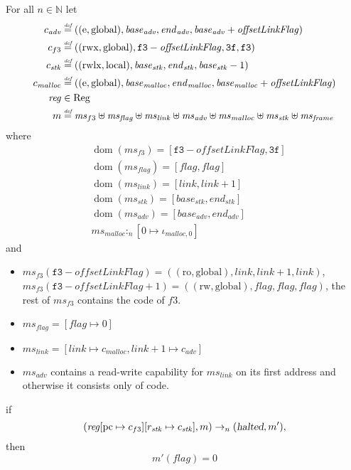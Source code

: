 \documentclass[a4paper]{article}
\newcommand{\update}[2]{[#1 \mapsto #2]}
\newcommand{\defeq}{\stackrel{\textit{\tiny{def}}}{=}}
\DeclareMathOperator{\dom}{dom}
\newcommand{\var}[1]{\mathit{#1}}
\newcommand{\hs}{\var{ms}}
\newcommand{\ms}{\hs}
\newcommand{\pcreg}{\mathrm{pc}}
\newcommand{\start}{\var{base}}
\newcommand{\addrend}{\var{end}}
\newcommand{\reg}{\var{reg}}
\newcommand{\heap}{\var{mem}}
\newcommand{\adv}{\var{adv}}
\newcommand{\link}{\var{link}}
\newcommand{\stk}{\var{stk}}
\newcommand{\flag}{\var{flag}}
\newcommand{\olf}{\var{offsetLinkFlag}}
\newcommand{\halted}{\textsl{halted}}
\newcommand{\heapSat}[3][\heap]{#1 :_{#2} #3}
\newcommand{\codelabel}[1]{\mathit{#1}}
\newcommand{\malloc}{\codelabel{malloc}}
\newcommand{\plaindom}[1]{\mathrm{#1}}
\newcommand{\Regs}{\plaindom{Reg}}
\newcommand{\nats}{\mathbb{N}}
\newcommand{\plainperm}[1]{\mathrm{#1}}
\newcommand{\readonly}{\plainperm{ro}}
\newcommand{\readwrite}{\plainperm{rw}}
\newcommand{\entry}{\plainperm{e}}
\newcommand{\rwx}{\plainperm{rwx}}
\newcommand{\rwlx}{\plainperm{rwlx}}
\newcommand{\local}{\plainperm{local}}
\newcommand{\glob}{\plainperm{global}}
\newcommand{\step}[1][]{\rightarrow_{#1}}
\begin{document}
\begin{lemma}
  \label{lem:correctness-f3}
  For all $n \in \nats$
  let
  \begin{align*}
    c_{\var{adv}} & \defeq ((\entry,\glob),\start_{\adv},\addrend_{\adv},\start_{\adv}+\olf) \\
    c_{f3} & \defeq ((\rwx,\glob),\mathtt{f3}-\olf,\mathtt{3f},\mathtt{f3}) \\
    c_{\var{stk}} & \defeq ((\rwlx,\local),\start_\stk,\addrend_\stk,\start_\stk-1) \\
    c_\malloc & \defeq ((\entry,\glob),\start_\malloc,\addrend_\malloc,\start_\malloc+\olf) \\
    \reg & \in \Regs \\
    m & \defeq \hs_{f3} \uplus 
        \hs_\flag \uplus                
        \ms_{\var{link}} \uplus 
        \hs_\adv \uplus 
        \ms_{\malloc} \uplus 
        \ms_{\var{stk}} \uplus
        \ms_{\var{frame}} 
  \end{align*}
  where 
  \begin{align*}
    &\dom(\hs_{f3}) = [\mathtt{f3}-\olf,\mathtt{3f}] \\
    &\dom(\hs_\flag) = [\flag,\flag] \\
    &\dom(\ms_\link) = [\link,\link+1]\\
    &\dom(\ms_\stk) = [\start_\stk, \addrend_\stk]\\
    &\dom(\hs_{\adv}) = [\start_\adv,\addrend_\adv] \\
    &\heapSat[\hs_{\malloc}]{n}{[0 \mapsto \iota_{\malloc,0}]}
  \end{align*}
  and
  \begin{itemize}
  \item $\ms_{f3}(\mathtt{f3}-\olf) = ((\readonly,\glob),\link,\link+1,\link)$, $\ms_{f3}(\mathtt{f3}-\olf+1) = ((\readwrite,\glob),\flag,\flag,\flag)$, the rest of $\hs_{f3}$ contains the code of $f3$.
  \item $\ms_\flag = [\flag \mapsto 0]$
  \item $\ms_{\var{link}} = [\var{link} \mapsto c_\malloc, \var{link} + 1 \mapsto c_\adv]$
  \item $\hs_\adv$ contains a read-write capability for $\hs_\link$ on its first address and otherwise it consists only of code.
  \end{itemize}
  if 
  \[
    (\reg\update{\pcreg}{c_{f3}}\update{r_\stk}{c_\stk},m) \step[n] (\halted,m'),
  \]
  then
  \[
    m'(\flag) = 0
  \]  
\end{lemma}
\end{document}
